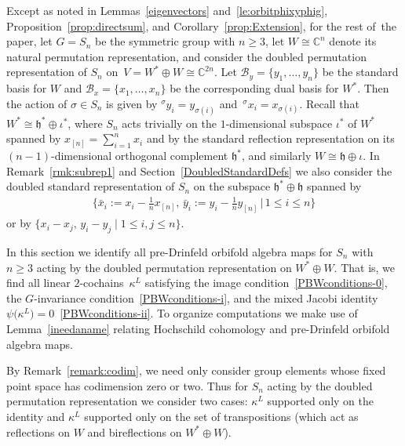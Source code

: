 \documentclass[pdftex]{sigma}
\numberwithin{equation}{section}
\newcommand{\actby}[1]{{}^{#1}}
\begin{document}
Except as noted in Lemmas~\ref{eigenvectors} and~\ref{le:orbitphixyphig}, Proposition~\ref{prop:directsum},
and Corollary~\ref{prop:Extension}, for the rest of~the paper,
let $G=S_n$ be the symmetric group with $n\geq 3$, let
$W \cong \mathbb{C}^n$ denote its natural permutation representation, and
consider the doubled permutation representation of $S_n$ on~$V=W^* \oplus W\cong \mathbb{C}^{2n}$.
Let $\mathcal{B}_y=\{y_1,\dots,y_n\}$ be the standard basis for $W$ and
$\mathcal{B}_x=\{x_1,\dots,x_n\}$ be the corresponding dual basis for $W^*$. Then the action
of $\sigma \in S_n$ is given by $\actby{\sigma}y_i=y_{\sigma(i)}$ and~$\actby{\sigma}x_i=x_{\sigma(i)}$. Recall that $W^* \cong \mathfrak{h}^* \oplus \iota^*$,
where $S_n$ acts trivially on the $1$-dimensional subspace $\iota^*$ of $W^*$
spanned by $x_{[n]}=\sum\limits_{i=1}^n x_i$ and by the standard reflection
representation on its $(n-1)$-dimensional orthogonal complement $\mathfrak{h}^*$,
and similarly $W \cong \mathfrak{h} \oplus \iota$.
In Remark~\ref{rmk:subrep1} and Section~\ref{DoubledStandardDefs} we also
consider the doubled standard representation of $S_n$ on the
subspace $\mathfrak{h}^* \oplus \mathfrak{h}$ spanned by{\samepage
\begin{gather}
\label{xbar}
\bigg\{\bar{x}_i:=x_i-\frac{1}{n}x_{[n]},\,\bar{y}_i:=y_i-\frac{1}{n}y_{[n]} \,\bigg|\, 1 \leq i \leq n\bigg\}
\end{gather}
or by $\{x_i-x_j,\, y_i-y_j \mid 1 \leq i,j \leq n\}$.}

In this section we identify all pre-Drinfeld orbifold algebra maps for $S_n$ with $n \geq 3$ acting by the doubled permutation representation on $W^*\oplus W$.
That is, we find all linear $2$-cochains~$\kappa^L$
satisfying the image condition~\eqref{PBWconditions-0}, the $G$-invariance condition~\eqref{PBWconditions-i}, and the mixed Jacobi identity $\psi\big(\kappa^L\big)=0$~\eqref{PBWconditions-ii}. To organize computations we make use of Lemma~\ref{ineedaname} relating Hochschild cohomology
and pre-Drinfeld orbifold algebra maps.

By Remark~\ref{remark:codim}, we need only consider group elements whose fixed point space has codimension zero or two.
Thus for $S_n$ acting by the doubled permutation representation we consider two cases: $\kappa^L$ supported only on the identity
and $\kappa^L$ supported only on the set of transpositions (which act as reflections on $W$ and bireflections on $W^*\oplus W$).
\end{document}
